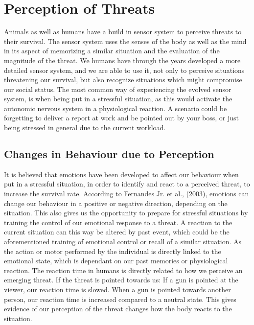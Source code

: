 \section{Perception of Threats} \label{perception}
Animals as well as humans have a build in sensor system to perceive threats to their survival. The sensor system uses the senses of the body as well as the mind in its aspect of memorizing a similar situation and the evaluation of the magnitude of the threat. We humans have through the years developed a more detailed sensor system, and we are able to use it, not only to perceive situations threatening our survival, but also recognize situations which might compromise our social status. The most common way of experiencing the evolved sensor system, is when being put in a stressful situation, as this would activate the autonomic nervous system in a physiological reaction. A scenario could be forgetting to deliver a report at work and be pointed out by your boss, or just being stressed in general due to the current workload.


\subsection{Changes in Behaviour due to Perception}
It is believed that emotions have been developed to affect our behaviour when put in a stressful situation, in order to identify and react to a perceived threat, to increase the survival rate. According to Fernandes Jr. et al., (2003), emotions can change our behaviour in a positive or negative direction, depending on the situation. This also gives us the opportunity to prepare for stressful situations by training the control of our emotional response to a threat. A reaction to the current situation can this way be altered by past event, which could be the aforementioned training of emotional control or recall of a similar situation. As the action or motor performed by the individual is directly linked to the emotional state, which is dependant on our past memories or physiological reaction. The reaction time in humans is directly related to how we perceive an emerging threat. If the threat is pointed towards us: If a gun is pointed at the viewer, our reaction time is slowed. When a gun is pointed towards another person, our reaction time is increased compared to a neutral state. This gives evidence of our perception of the threat changes how the body reacts to the situation.
\cite{threat_behaviour}

